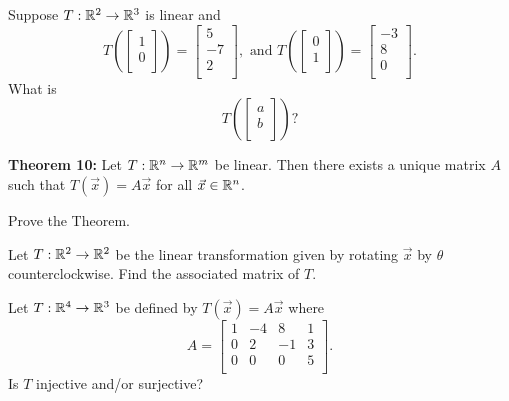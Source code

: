\begin{enumerate}

\Problem Suppose $T: \mathbb{R}^2 \to \mathbb{R}^3$ is linear and $$T\left( \begin{bmatrix} 1\\ 0\\ \end{bmatrix} \right)=\begin{bmatrix} 5\\ -7\\ 2\\ \end{bmatrix}, \text{ and } T\left( \begin{bmatrix} 0\\ 1\\ \end{bmatrix} \right)=\begin{bmatrix} -3\\ 8\\ 0\\ \end{bmatrix}.$$ What is $$T\left( \begin{bmatrix} a\\ b\\ \end{bmatrix} \right)?$$

\vfill


{\bf Theorem 10:} Let $T: \mathbb{R}^n \to \mathbb{R}^m$ be linear. Then there exists a unique matrix $A$ such that $T(\vec{x})=A\vec{x}$ for all $\vec{x} \in \mathbb{R}^n$.

\Problem Prove the Theorem.

\vfill

\vfill 

\newpage

\Problem Let $T: \mathbb{R}^2 \to \mathbb{R}^2$ be the linear transformation given by rotating $\vec{x}$ by $\theta$ counterclockwise. Find the associated matrix of $T$.

\vfill

\Problem Let $T: \mathbb{R}^4 \to \mathbb{R}^3$ be defined by $T(\vec{x})=A\vec{x}$ where $$A=\begin{bmatrix}
1 & -4 & 8 &1\\
0 & 2 & -1 &3\\
0 & 0 &0 & 5\\
\end{bmatrix}.$$ Is $T$ injective and/or surjective?

\vfill


\end{enumerate}
